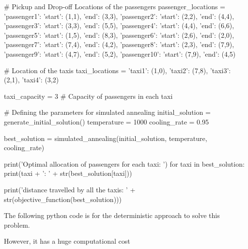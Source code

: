 \documentclass{article}
\begin{document}
\begin{pythoncode}
# Pickup and Drop-off Locations of the passengers
passenger_locations = {
    'passenger1': {'start': (1,1), 'end': (3,3)},
    'passenger2': {'start': (2,2), 'end': (4,4)},
    'passenger3': {'start': (3,3), 'end': (5,5)},
    'passenger4': {'start': (4,4), 'end': (6,6)},
    'passenger5': {'start': (1,5), 'end': (8,3)},
    'passenger6': {'start': (2,6), 'end': (2,0)},
    'passenger7': {'start': (7,4), 'end': (4,2)},
    'passenger8': {'start': (2,3), 'end': (7,9)},
    'passenger9': {'start': (4,7), 'end': (5,2)},
    'passenger10': {'start': (7,9), 'end': (4,5)}
}

# Location of the taxis
taxi_locations = {
    'taxi1': (1,0),
    'taxi2': (7,8),
    'taxi3': (2,1),
    'taxi4': (3,2)
}

taxi_capacity = 3           # Capacity of passengers in each taxi

# Defining the parameters for simulated annealing
initial_solution = generate_initial_solution()
temperature = 1000
cooling_rate = 0.95

best_solution = simulated_annealing(initial_solution, temperature, cooling_rate)

print('Optimal allocation of passengers for each taxi: \n')
for taxi in best_solution:
  print(taxi + ': ' + str(best_solution[taxi]))
  
print('\nTotal distance travelled by all the taxis: ' +
                        str(objective_function(best_solution)))
\end{pythoncode}

\newpage

The following python code is for the deterministic approach to solve this problem.

However, it has a huge computational cost
\end{document}
